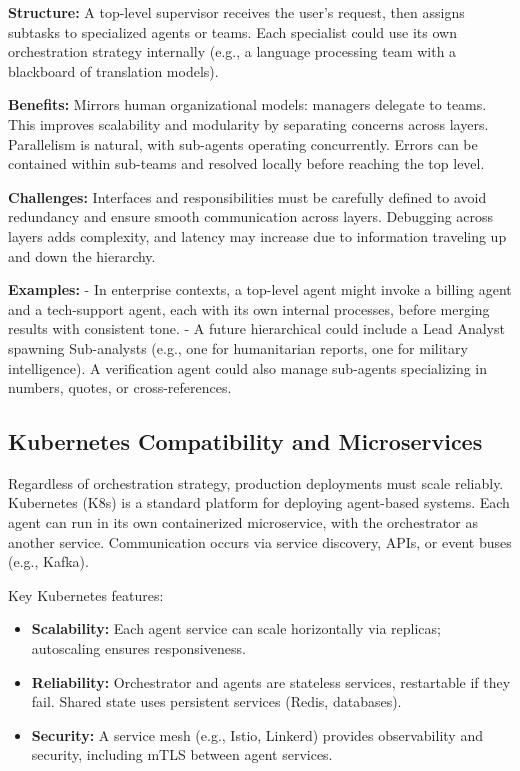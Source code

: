 \textbf{Structure:} A top-level supervisor receives the user’s request, then assigns subtasks to specialized agents or teams. Each specialist could use its own orchestration strategy internally (e.g., a language processing team with a blackboard of translation models).  

\textbf{Benefits:} Mirrors human organizational models: managers delegate to teams. This improves scalability and modularity by separating concerns across layers. Parallelism is natural, with sub-agents operating concurrently. Errors can be contained within sub-teams and resolved locally before reaching the top level.  

\textbf{Challenges:} Interfaces and responsibilities must be carefully defined to avoid redundancy and ensure smooth communication across layers. Debugging across layers adds complexity, and latency may increase due to information traveling up and down the hierarchy.  

\textbf{Examples:}  
- In enterprise contexts, a top-level agent might invoke a billing agent and a tech-support agent, each with its own internal processes, before merging results with consistent tone.  
- A future hierarchical \ishtar{} could include a Lead Analyst spawning Sub-analysts (e.g., one for humanitarian reports, one for military intelligence). A verification agent could also manage sub-agents specializing in numbers, quotes, or cross-references.  

\subsection*{Kubernetes Compatibility and Microservices}
Regardless of orchestration strategy, production deployments must scale reliably. Kubernetes (K8s) is a standard platform for deploying agent-based systems. Each agent can run in its own containerized microservice, with the orchestrator as another service. Communication occurs via service discovery, APIs, or event buses (e.g., Kafka).  

Key Kubernetes features:  
\begin{itemize}
    \item \textbf{Scalability:} Each agent service can scale horizontally via replicas; autoscaling ensures responsiveness.  
    \item \textbf{Reliability:} Orchestrator and agents are stateless services, restartable if they fail. Shared state uses persistent services (Redis, databases).  
    \item \textbf{Security:} A service mesh (e.g., Istio, Linkerd) provides observability and security, including mTLS between agent services.  
\end{itemize}  

